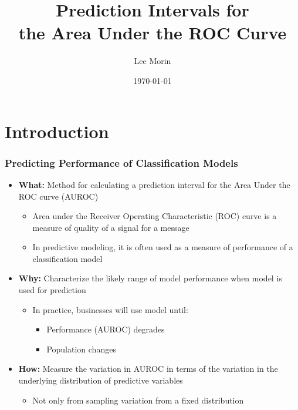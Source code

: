 \documentclass{beamer}
\title{Prediction Intervals for\\
    the Area Under the ROC Curve}
\author[Lee Morin, Queen's University]{Lee Morin}
\institute[Queen's University]
{
    Department of Economics \\
    Queen's University
}
\date{\today}
\begin{document}

\frame{\titlepage}

\section[Outline]{}

\frame{\tableofcontents}




\section{Introduction}



\begin{frame}
\frametitle{Predicting Performance of Classification Models}

\begin{itemize}
    \item \textbf{What:} Method for calculating a prediction interval for the Area Under the ROC curve (AUROC)
    \begin{itemize}
        \item Area under the Receiver Operating Characteristic (ROC) curve is a measure of quality of a signal for a message
        \item In predictive modeling, it is often used as a measure of performance of a classification model
    \end{itemize}
    \item \textbf{Why:} Characterize the likely range of model performance when model is used for prediction
    \begin{itemize}
        \item In practice, businesses will use model until:
        \begin{itemize}
            \item Performance (AUROC) degrades
            \item Population changes
        \end{itemize}
    \end{itemize}
    \item \textbf{How:} Measure the variation in AUROC in terms of the variation in the underlying distribution of predictive variables
    \begin{itemize}
        \item Not only from sampling variation from a fixed distribution
    \end{itemize}
\end{itemize}

\end{frame}
\end{document}
